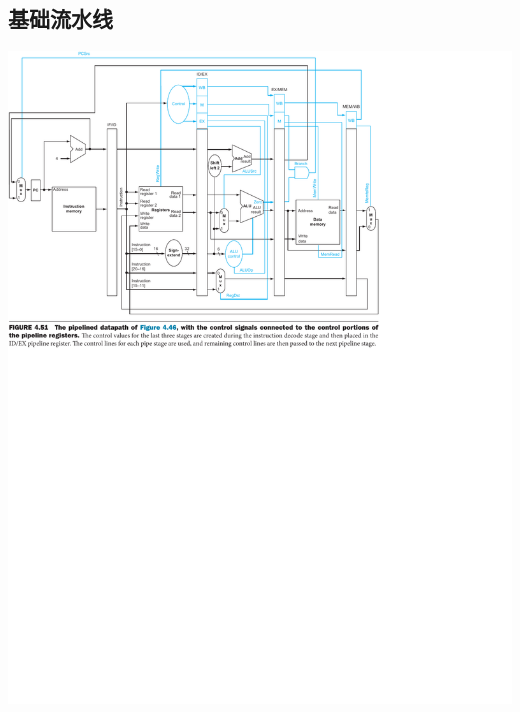 \documentclass[a4paper,UTF8]{ctexart}
\begin{document}
\subsection{基础流水线}
\includegraphics[width=\textwidth]{pipeline.pdf}
\end{document}
